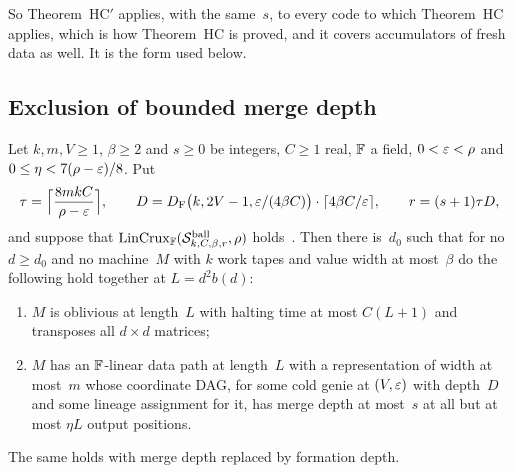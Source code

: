 So Theorem~HC$'$ applies, with the same~$s$, to every code to which Theorem~HC applies, which is how Theorem~HC is
proved, and it covers accumulators of fresh data as well. It is the form used below.

\subsection{Exclusion of bounded merge depth}\label{sec:hop-excl}

\begin{corollary}\label{cor:HC}
Let $k,m,V\ge1$, $\beta\ge2$ and $s\ge0$ be integers, $C\ge1$ real, $\mathbb{F}$ a field, $0<\varepsilon<\rho$ and
$0\le\eta<7(\rho-\varepsilon)/8$. Put
\[
  \tau=\Bigl\lceil\frac{8mkC}{\rho-\varepsilon}\Bigr\rceil,\qquad
  D=D_{\mathrm F}\bigl(k,2V-1,\varepsilon/(4\beta C)\bigr)\cdot\lceil4\beta C/\varepsilon\rceil,\qquad r=(s+1)\tau D,
\]
and suppose that $\mathrm{LinCrux}_{\mathbb{F}}(\mathcal S^{\mathrm{ball}}_{k,C,\beta,r},\rho)$ holds~\cite[Definition~7.4]{BoundedNesting2026}. Then there
is~$d_0$ such that for no $d\ge d_0$ and no machine~$M$ with $k$ work tapes and value width at most~$\beta$ do the
following hold together at $L=d^2b(d)$:
\begin{enumerate}[label=(\roman*)]
\item $M$ is oblivious at length~$L$ with halting time at most $C(L+1)$ and transposes all $d\times d$ matrices;
\item $M$ has an $\mathbb{F}$-linear data path at length~$L$ with a representation of width at most~$m$ whose coordinate DAG,
for some cold genie at $(V,\varepsilon)$ with depth~$D$ and some lineage assignment for it, has merge depth at most~$s$ at all
but at most $\eta L$ output positions.
\end{enumerate}
The same holds with merge depth replaced by formation depth.
\end{corollary}

